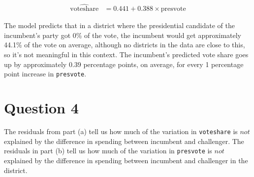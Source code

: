 \documentclass[12pt,letterpaper]{article}
\begin{document}
\begin{enumerate}
		\begin{align*}
			\widehat{\text{voteshare}} &= 0.441 + 0.388 \times \text{presvote}
		\end{align*}
		
		\noindent The model predicts that in a district where the presidential candidate of the incumbent's party got 0\% of the vote, the incumbent would get approximately 44.1\% of the vote on average, although no districts in the data are close to this, so it's not meaningful in this context. The incumbent's predicted vote share goes up by approximately 0.39 percentage points, on average, for every 1 percentage point increase in \texttt{presvote}.
	\end{enumerate}
	

\newpage	
\section*{Question 4}
\noindent The residuals from part (a) tell us how much of the variation in \texttt{voteshare} is $not$ explained by the difference in spending between incumbent and challenger. The residuals in part (b) tell us how much of the variation in \texttt{presvote} is $not$ explained by the difference in spending between incumbent and challenger in the district.
\end{document}

